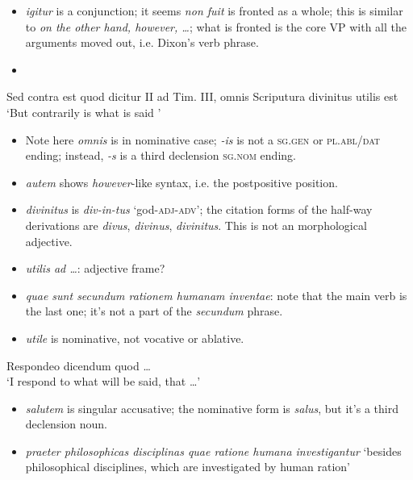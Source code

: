 \documentclass[a4paper, 12pt]{article}
\newcommand{\form}[1]{\emph{#1}}
\newcommand*{\category}[1]{\textsc{#1}}
\newcommand{\translate}[1]{`#1'}
\begin{document}
\begin{itemize}
    \item \form{igitur} is a conjunction; it seems \form{non fuit} is fronted as a whole; 
    this is similar to \form{on the other hand, however, \dots}; 
    what is fronted is the core VP 
    with all the arguments moved out, i.e. Dixon's verb phrase.
    \item 
\end{itemize}

\begin{exe}
    \ex Sed contra est quod dicitur II ad Tim. III, omnis Scriputura divinitus utilis est \\
    \translate{But contrarily is what is said }
\end{exe}

\begin{itemize}
    \item Note here \form{omnis} is in nominative case; 
    \form{-is} is not a \category{sg.gen} or \category{pl.abl/dat} ending;
    instead, \form{-s} is a third declension \category{sg.nom} ending. 
    \item \form{autem} shows \form{however}-like syntax, i.e. the postpositive position.
    \item \form{divinitus} is \form{div-in-tus} \translate{god-\category{adj}-\category{adv}}; 
    the citation forms of the half-way derivations are 
    \form{divus}, \form{divinus}, \form{divinitus}.
    This is not an morphological adjective. 
    \item \form{utilis ad \dots}: adjective frame?
    \item \form{quae sunt secundum rationem humanam inventae}: note that the main verb is the last one; 
    it's not a part of the \form{secundum} phrase.
    \item \form{utile} is nominative, not vocative or ablative.
\end{itemize}

\begin{exe}
    \ex Respondeo dicendum quod \dots \\ 
    \translate{I respond to what will be said, that \dots}
\end{exe}

\begin{itemize}
    \item \form{salutem} is singular accusative; the nominative form is \form{salus}, 
    but it's a third declension noun.
    \item \form{praeter philosophicas disciplinas quae ratione humana investigantur} 
        \translate{besides philosophical disciplines, which are investigated by human ration}
\end{itemize}
\end{document}

